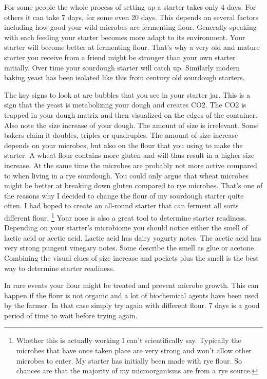 For some people the whole process of setting up a starter takes
only 4 days. For others it can take 7 days, for some even 20 days.
This depends on several factors including how good your wild microbes
are fermenting flour. Generally speaking with each feeding
your starter becomes more adapt to its environment. Your
starter will become better at fermenting flour. That's why
a very old and mature starter you receive from a friend might
be stronger than your own starter initially. Over time
your sourdough starter will catch up. Similarly modern baking
yeast has been isolated like this from century old sourdough
starters. 

The key signs to look at are bubbles that you see in your starter
jar. This is a sign that the yeast is metabolizing your
dough and creates CO2. The CO2 is trapped in your dough
matrix and then visualized on the edges of the container.
Also note the size increase of your dough. The amount of size
is irrelevant. Some bakers claim it doubles, triples or quadruples.
The amount of size increase depends on your microbes, but also on
the flour that you using to make the starter. A wheat flour contains
more gluten and will thus result in a higher size increase. At
the same time the microbes are probably not more active compared
to when living in a rye sourdough. You could only argue that
wheat microbes might be better at breaking down gluten compared
to rye microbes. That's one of the reasons why I decided to change
the flour of my sourdough starter quite often. I had hoped to create
an all-round starter that can ferment all sorts different flour.
\footnote{Whether this is actually working I can't scientifically say.
Typically the microbes that have once taken place are very strong
and won't allow other microbes to enter. My starter has initially
been made with rye flour. So chances are that the majority of
my microorganisms are from a rye source.} Your nose is also
a great tool to determine starter readiness. Depending on
your starter's microbiome you should notice either the smell
of lactic acid or acetic acid. Lactic acid has dairy yogurty notes.
The acetic acid has very strong pungent vinegary notes. Some
describe the smell as glue or acetone. Combining the visual clues
of size increase and pockets plus the smell is the best way
to determine starter readiness.

In rare events your flour might be treated and prevent microbe growth.
This can happen if the flour is not organic and a lot of biochemical
agents have been used by the farmer. In that case simply try again
with different flour. 7 days is a good period of time to wait before
trying again.

